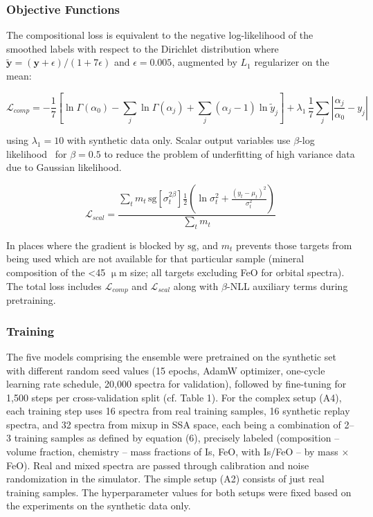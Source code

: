 \documentclass[remotesensing,article,submit,pdftex,moreauthors]{Definitions/mdpi}
\begin{document}
\subsubsection{Objective Functions}

The compositional loss is equivalent to the negative log-likelihood of the smoothed labels with respect to the Dirichlet distribution where $\tilde{\mathbf y} = (\mathbf y + \epsilon)/(1 + 7\epsilon)$ and $\epsilon = 0.005$, augmented by $L_1$ regularizer on the mean:

\begin{equation}
\mathcal L_{comp} = -\frac{1}{7}\left[\ln\Gamma(\alpha_0) - \sum_j \ln\Gamma(\alpha_j) + \sum_j(\alpha_j-1)\ln\tilde y_j\right] + \lambda_1\,\frac{1}{7}\sum_j\left|\frac{\alpha_j}{\alpha_0} - y_j\right|
\label{eq7}
\end{equation}

using $\lambda_1 = 10$ with synthetic data only. Scalar output variables use $\beta$-log likelihood~\cite{seitzer2022} for $\beta=0.5$ to reduce the problem of underfitting of high variance data due to Gaussian likelihood.

\begin{equation}
\mathcal L_{scal} = \frac{\sum_t m_t\,\mathrm{sg}\!\left[\sigma_t^{2\beta}\right]\tfrac12\left(\ln\sigma_t^2 + \frac{(y_t-\mu_t)^2}{\sigma_t^2}\right)}{\sum_t m_t}
\label{eq8}
\end{equation}

In places where the gradient is blocked by $\mathrm{sg}$, and $m_t$ prevents those targets from being used which are not available for that particular sample (mineral composition of the <45 $\upmu$m size; all targets excluding FeO for orbital spectra). The total loss includes $\mathcal L_{comp}$ and $\mathcal L_{scal}$ along with $\beta$-NLL auxiliary terms during pretraining.

\subsubsection{Training}

The five models comprising the ensemble were pretrained on the synthetic set with different random seed values (15 epochs, AdamW optimizer, one-cycle learning rate schedule, 20,000 spectra for validation), followed by fine-tuning for 1,500 steps per cross-validation split (cf. Table 1). For the complex setup (A4), each training step uses 16 spectra from real training samples, 16 synthetic replay spectra, and 32 spectra from mixup in SSA space, each being a combination of 2--3 training samples as defined by equation (6), precisely labeled (composition -- volume fraction, chemistry -- mass fractions of Is, FeO, with Is/FeO -- by mass $\times$ FeO). Real and mixed spectra are passed through calibration and noise randomization in the simulator. The simple setup (A2) consists of just real training samples. The hyperparameter values for both setups were fixed based on the experiments on the synthetic data only.
\end{document}
